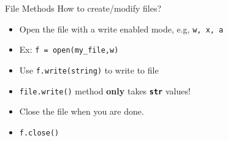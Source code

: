     \begin{frame}{File Methods}
        \LARGE
        How to create/modify files?
        \begin{itemize}
            \item Open the file with a write enabled mode, e.g, \texttt{w, x, a}
            \pause
            \item Ex: \texttt{f = open(\textquotesingle my\_file\textquotesingle ,\textquotesingle w\textquotesingle )}
            \pause
            \item Use \texttt{f.write(string)} to write to file
            \pause
            \item \texttt{file.write()} method \textbf{only} takes \texttt{\textbf{str}} values!
            \pause
            \item Close the file when you are done.
            \pause
            \item \texttt{f.close()}
        \end{itemize}
    \end{frame}

